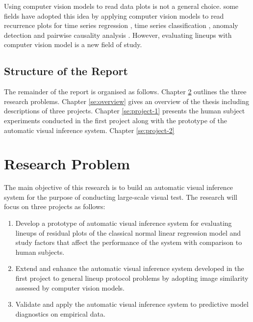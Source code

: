 \documentclass{monashthesis}
\theoremstyle{definition}
\theoremstyle{definition}
\theoremstyle{definition}
\theoremstyle{definition}
\theoremstyle{remark}
\begin{document}
Using computer vision models to read data plots is not a general choice. some fields have adopted this idea by applying computer vision models to read recurrence plots for time series regression \autocite{ojeda_multivariate_2020}, time series classification \autocite{chu_automatic_2019,hailesilassie_financial_2019,hatami_classification_2018,zhang_encoding_2020}, anomaly detection \autocite{chen_convolutional_2020} and pairwise causality analysis \autocite{singh_deep_2017}. However, evaluating lineups with computer vision model is a new field of study.

\hypertarget{structure-of-the-report}{%
\section{Structure of the Report}\label{structure-of-the-report}}

The remainder of the report is organised as follows. Chapter \ref{se:research-problem} outlines the three research problems. Chapter \ref{se:overview} gives an overview of the thesis including descriptions of three projects. Chapter \ref{se:project-1} presents the human subject experiments conducted in the first project along with the prototype of the automatic visual inference system. Chapter \ref{se:project-2}

\hypertarget{se:research-problem}{%
\chapter{Research Problem}\label{se:research-problem}}

The main objective of this research is to build an automatic visual inference system for the purpose of conducting large-scale visual test. The research will focus on three projects as follows:

\begin{enumerate}
\def\labelenumi{\arabic{enumi}.}
\item
  Develop a prototype of automatic visual inference system for evaluating lineups of residual plots of the classical normal linear regression model and study factors that affect the performance of the system with comparison to human subjects.
\item
  Extend and enhance the automatic visual inference system developed in the first project to general lineup protocol problems by adopting image similarity assessed by computer vision models.
\item
  Validate and apply the automatic visual inference system to predictive model diagnostics on empirical data.
\end{enumerate}
\end{document}

